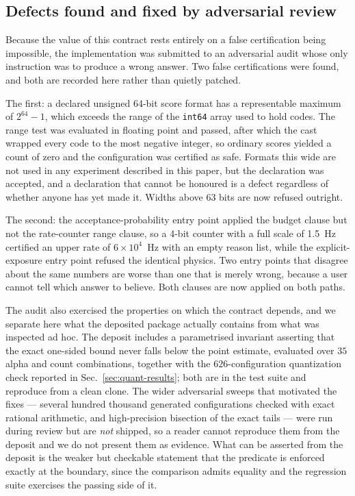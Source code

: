 \documentclass[preprint,12pt]{elsarticle}
\begin{document}
\subsection{Defects found and fixed by adversarial review}
\label{sec:defects}

Because the value of this contract rests entirely on a false certification being
impossible, the implementation was submitted to an adversarial audit whose only
instruction was to produce a wrong answer.  Two false certifications were found,
and both are recorded here rather than quietly patched.

The first: a declared unsigned 64-bit score format has a representable maximum
of $2^{64}-1$, which exceeds the range of the \texttt{int64} array used to hold
codes.  The range test was evaluated in floating point and passed, after which
the cast wrapped every code to the most negative integer, so ordinary scores
yielded a count of zero and the configuration was certified as safe.  Formats
this wide are not used in any experiment described in this paper, but the
declaration was accepted, and a declaration that cannot be honoured is a defect
regardless of whether anyone has yet made it.  Widths above 63 bits are now
refused outright.

The second: the acceptance-probability entry point applied the budget clause but
not the rate-counter range clause, so a 4-bit counter with a full scale of
1.5~Hz certified an upper rate of $6\times10^4$~Hz with an empty reason list,
while the explicit-exposure entry point refused the identical physics.  Two
entry points that disagree about the same numbers are worse than one that is
merely wrong, because a user cannot tell which answer to believe.  Both clauses
are now applied on both paths.

The audit also exercised the properties on which the contract depends, and we
separate here what the deposited package actually contains from what was
inspected ad hoc.  The deposit includes a parametrised invariant asserting that
the exact one-sided bound never falls below the point estimate, evaluated over
$35$ alpha and count combinations, together with the $626$-configuration
quantization check reported in Sec.~\ref{sec:quant-results}; both are in the test
suite and reproduce from a clean clone.  The wider adversarial sweeps that
motivated the fixes --- several hundred thousand generated configurations checked
with exact rational arithmetic, and high-precision bisection of the exact tails
--- were run during review but are \emph{not} shipped, so a reader cannot
reproduce them from the deposit and we do not present them as evidence.  What can
be asserted from the deposit is the weaker but checkable statement that the
predicate is enforced exactly at the boundary, since the comparison admits
equality and the regression suite exercises the passing side of it.
\end{document}
